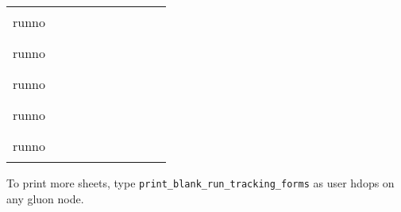 \documentclass[12pt]{article}
\newcommand{\cbox}{\raisebox{.6ex}{\fbox{\rule{0in}{0.05in}\rule{0.05in}{0in}}}}
\newcommand{\eline}{\rule{0.4in}{0.01in}}
\newcommand{\cmline}{\rule{2.0in}{0.01in}}
\begin{document}
\begin{tabular}{lccccccccc}
runno & \cbox & \cbox & \eline & \eline & \eline & \eline & \eline & \cbox & \cmline \\[0.240in]
runno & \cbox & \cbox & \eline & \eline & \eline & \eline & \eline & \cbox & \cmline \\[0.240in]
runno & \cbox & \cbox & \eline & \eline & \eline & \eline & \eline & \cbox & \cmline \\[0.240in]
runno & \cbox & \cbox & \eline & \eline & \eline & \eline & \eline & \cbox & \cmline \\[0.240in]
runno & \cbox & \cbox & \eline & \eline & \eline & \eline & \eline & \cbox & \cmline \\[0.240in]
\end{tabular}

\begin{center}
To print more sheets, type {\tt print\_blank\_run\_tracking\_forms} as user hdops on any gluon node.
\end{center}
\end{document}
